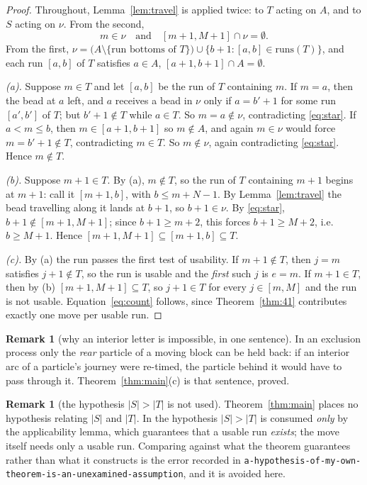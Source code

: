 \documentclass[11pt]{article}
\theoremstyle{plain}
\theoremstyle{definition}
\newtheorem{rem}[thm]{Remark}
\begin{document}
\begin{proof}
Throughout, Lemma~\ref{lem:travel} is applied twice: to $T$ acting on $A$, and to $S$ acting on
$\nu$. From the second,
\begin{equation}\label{eq:star}
  m\in\nu\quad\text{and}\quad[m+1,M+1]\cap\nu=\emptyset. \tag{$*$}
\end{equation}
From the first, $\nu=\bigl(A\setminus\{\text{run bottoms of }T\}\bigr)\cup\{b+1:[a,b]\in
\mathrm{runs}(T)\}$, and each run $[a,b]$ of $T$ satisfies $a\in A$, $[a+1,b+1]\cap A=\emptyset$.

\emph{(a).} Suppose $m\in T$ and let $[a,b]$ be the run of $T$ containing $m$.
If $m=a$, then the bead at $a$ left, and $a$ receives a bead in $\nu$ only if $a=b'+1$ for some
run $[a',b']$ of $T$; but $b'+1\notin T$ while $a\in T$. So $m=a\notin\nu$, contradicting
\eqref{eq:star}. If $a<m\le b$, then $m\in[a+1,b+1]$ so $m\notin A$, and again $m\in\nu$ would
force $m=b'+1\notin T$, contradicting $m\in T$. So $m\notin\nu$, again contradicting
\eqref{eq:star}. Hence $m\notin T$.

\emph{(b).} Suppose $m+1\in T$. By (a), $m\notin T$, so the run of $T$ containing $m+1$ begins
at $m+1$: call it $[m+1,b]$, with $b\le m+N-1$. By Lemma~\ref{lem:travel} the bead travelling
along it lands at $b+1$, so $b+1\in\nu$. By \eqref{eq:star}, $b+1\notin[m+1,M+1]$; since
$b+1\ge m+2$, this forces $b+1\ge M+2$, i.e.\ $b\ge M+1$. Hence
$[m+1,M+1]\subseteq[m+1,b]\subseteq T$.

\emph{(c).} By (a) the run passes the first test of usability. If $m+1\notin T$, then $j=m$
satisfies $j+1\notin T$, so the run is usable and the \emph{first} such $j$ is $e=m$. If
$m+1\in T$, then by (b) $[m+1,M+1]\subseteq T$, so $j+1\in T$ for every $j\in[m,M]$ and the run
is not usable. Equation~\eqref{eq:count} follows, since Theorem~\ref{thm:41} contributes exactly
one move per usable run.
\end{proof}

\begin{rem}[why an interior letter is impossible, in one sentence]
In an exclusion process only the \emph{rear} particle of a moving block can be held back: if an
interior arc of a particle's journey were re-timed, the particle behind it would have to pass
through it. Theorem~\ref{thm:main}(c) is that sentence, proved.
\end{rem}

\begin{rem}[the hypothesis $|S|>|T|$ is not used]
Theorem~\ref{thm:main} places no hypothesis relating $|S|$ and $|T|$. In
\cite[Thm.~4.1]{ClioExch} the hypothesis $|S|>|T|$ is consumed \emph{only} by the
applicability lemma, which guarantees that a usable run \emph{exists}; the move itself needs
only a usable run. Comparing against what the theorem guarantees rather than what it
constructs is the error recorded in
\texttt{a-hypothesis-of-my-own-theorem-is-an-unexamined-assumption}, and it is avoided here.
\end{rem}
\end{document}
